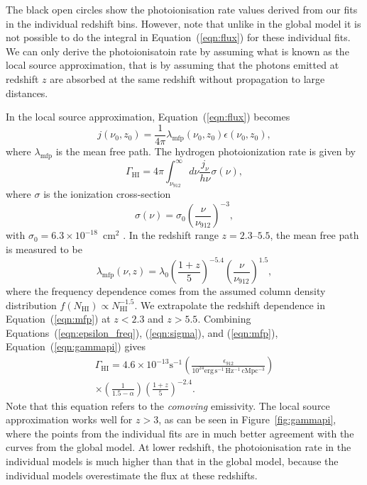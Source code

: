 \documentclass[a4paper,fleqn,usenatbib]{mnras}
\begin{document}
The black open circles show the photoionisation rate values derived
from our fits in the individual redshift bins.  However, note that
unlike in the global model it is not possible to do the integral in
Equation~(\ref{eqn:flux}) for these individual fits.  We can only
derive the photoionisatoin rate by assuming what is known as the local
source approximation, that is by assuming that the photons emitted at
redshift $z$ are absorbed at the same redshift without propagation to
large distances.

In the local source approximation, Equation~(\ref{eqn:flux}) becomes
\begin{equation}
  j(\nu_0, z_0) = \frac{1}{4\pi}\lambda_\mathrm{mfp}(\nu_0, z_0)\epsilon(\nu_0, z_0),
\end{equation}
where $\lambda_\mathrm{mfp}$ is the mean free path.  The hydrogen
photoionization rate is given by
\begin{equation}
  \Gamma_\mathrm{HI}=4\pi\int_{\nu_{912}}^\infty d\nu \frac{j_\nu}{h\nu} \sigma(\nu),
  \label{eqn:gammapi}
\end{equation}
where $\sigma$ is the ionization cross-section
\begin{equation}
  \sigma(\nu) = \sigma_0\left(\frac{\nu}{\nu_{912}}\right)^{-3},
  \label{eqn:sigma}
\end{equation}
with $\sigma_0=6.3\times 10^{-18}$~cm$^2$ \citep{2006agna.book.....O}.
In the redshift range $z=2.3$--$5.5$, the mean free path is measured
to be \citep{2014MNRAS.445.1745W}
\begin{equation}
  \lambda_\mathrm{mfp}(\nu, z)= \lambda_0\left(\frac{1+z}{5}\right)^{-5.4}\left(\frac{\nu}{\nu_{912}}\right)^{1.5},
  \label{eqn:mfp}
\end{equation}
where the frequency dependence comes from the assumed column density
distribution $f(N_\mathrm{HI})\propto N_\mathrm{HI}^{-1.5}$.  We
extrapolate the redshift dependence in Equation~(\ref{eqn:mfp}) at
$z<2.3$ and $z>5.5$.  Combining Equations~(\ref{eqn:epsilon_freq}),
(\ref{eqn:sigma}), and (\ref{eqn:mfp}), Equation~(\ref{eqn:gammapi})
gives
\begin{multline}
  \Gamma_\mathrm{HI}=4.6\times 10^{-13} \mathrm{s}^{-1} \left(\frac{\epsilon_{912}}{10^{24}\mathrm{erg\, s^{-1}\, Hz^{-1}\, cMpc^{-3}}}\right)\\
  \times\left(\frac{1}{1.5-\alpha}\right)\left(\frac{1+z}{5}\right)^{-2.4}.
\end{multline}
Note that this equation refers to the \emph{comoving} emissivity.  The
local source approximation works well for $z>3$, as can be seen in
Figure~\ref{fig:gammapi}, where the points from the individual fits
are in much better agreement with the curves from the global model.
At lower redshift, the photoionisation rate in the individual models
is much higher than that in the global model, because the individual
models overestimate the flux at these redshifts. 
\end{document}
